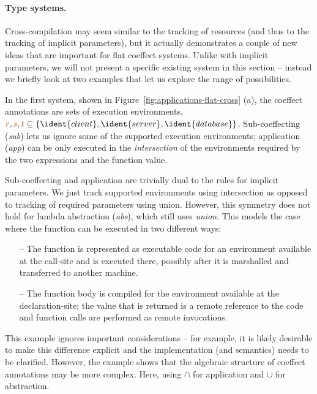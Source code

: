 
\paragraph{Type systems.}

Cross-compilation may seem similar to the tracking of resources (and thus to the tracking of implicit 
parameters), but it actually demonstrates a couple of new ideas that are important for flat coeffect 
systems. Unlike with implicit parameters, we will not present a specific existing system in this 
section -- instead we briefly look at two examples that let us explore the range of possibilities. 

In the first system, shown in Figure~\ref{fig:applications-flat-cross} (a), the coeffect annotations
are sets of execution environments, \ie~$\aclrd{r}, \aclrd{s}, \aclrd{t} \subseteq \{ \ident{client},
\ident{server}, \ident{database} \}$. Sub-coeffecting (\emph{sub}) lets us ignore some of the supported 
execution environments; application (\emph{app}) can be only executed in the \emph{intersection} of the
environments required by the two expressions and the function value.

Sub-coeffecting and application are trivially dual to the rules for implicit parameters. We just track
supported environments using intersection as opposed to tracking of required parameters using union.
However, this symmetry does not hold for lambda abstraction (\emph{abs}), which still uses \emph{union}.
This models the case where the function can be executed in two different ways:
%
\begin{itemize}
\item[--] The function is represented as executable code for an environment available at the call-site
  and is executed there, possibly after it is marshalled and transferred to another machine.
\vspace{-0.5em}
\item[--] The function body is compiled for the environment available at the declaration-site; the value
  that is returned is a remote reference to the code and function calls are performed as remote invocations.
\end{itemize}
%
This example ignores important considerations -- for example, it is likely desirable to make this
difference explicit and the implementation (and semantics) needs to be clarified. However, the
example shows that the algebraic structure of coeffect annotations may be more complex. Here, using
$\cap$ for application and $\cup$ for abstraction.

